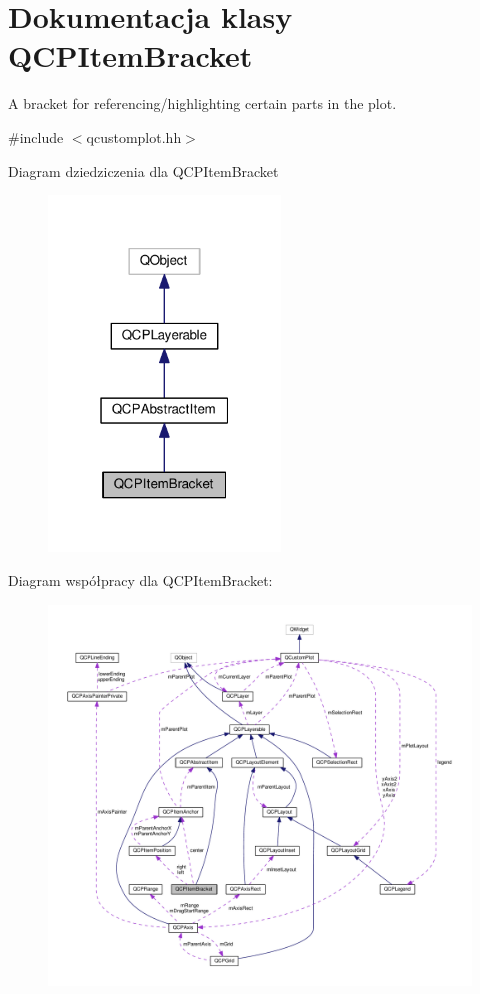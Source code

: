 \hypertarget{class_q_c_p_item_bracket}{}\section{Dokumentacja klasy Q\+C\+P\+Item\+Bracket}
\label{class_q_c_p_item_bracket}


A bracket for referencing/highlighting certain parts in the plot.  




{\ttfamily \#include $<$qcustomplot.\+hh$>$}



Diagram dziedziczenia dla Q\+C\+P\+Item\+Bracket\nopagebreak
\begin{figure}[H]
\begin{center}
\leavevmode
\includegraphics[width=175pt]{class_q_c_p_item_bracket__inherit__graph}
\end{center}
\end{figure}


Diagram współpracy dla Q\+C\+P\+Item\+Bracket\+:\nopagebreak
\begin{figure}[H]
\begin{center}
\leavevmode
\includegraphics[width=350pt]{class_q_c_p_item_bracket__coll__graph}
\end{center}
\end{figure}
